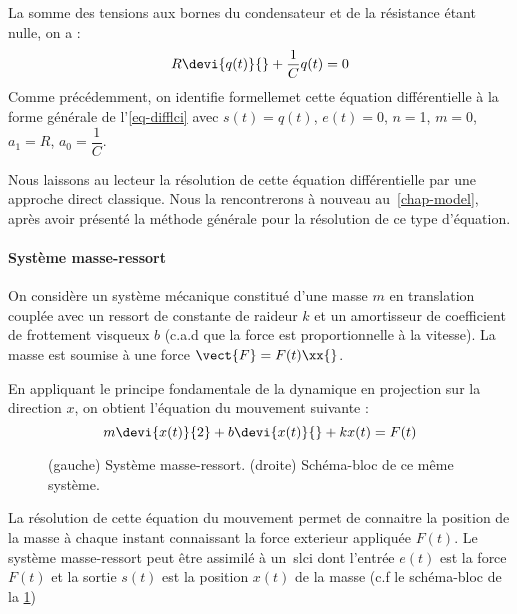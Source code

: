 La somme des tensions aux bornes du condensateur et de la résistance étant nulle, on a :
\begin{align*}
    R\devi{q(t)}{}+\dfrac{1}{C}q(t)=0 
\end{align*}
Comme précédemment, on identifie formellemet cette équation différentielle 
à la forme générale de l'\cref{eq-difflci} avec $s(t)=q(t)$, $e(t)=0$, 
$n=$1, $m=0$, $a_1=R$, $a_0=\dfrac{1}{C}$.

Nous laissons au lecteur la résolution de cette équation différentielle 
par une approche direct classique.
Nous la rencontrerons à nouveau au~\cref{chap-model}, après avoir 
présenté la méthode générale pour la résolution de ce type d'équation.

\paragraph{Système masse-ressort}

On considère un système mécanique constitué d'une masse $m$ en translation 
couplée avec un ressort de constante
de raideur $k$ et un amortisseur de coefficient de frottement 
visqueux $b$ (c.a.d que la force est 
proportionnelle à la vitesse). 
La masse est soumise à une force $\vect{F}=F(t)\xx{}$.

En appliquant le principe fondamentale de la dynamique en projection 
sur la direction $x$, on obtient l'équation du mouvement suivante :                                                                                 
$$                                                                                                                            
m\devi{x(t)}{2}+b\devi{x(t)}{}+kx(t)=F(t)
$$ 

\begin{figure}[!h]
    \centering
    
    \caption{(gauche) Système masse-ressort. (droite) Schéma-bloc de ce même système.\label{fig-masse-ressort}}
\end{figure}

La résolution de cette équation du mouvement permet de connaitre la position de la masse
à chaque instant connaissant la force exterieur appliquée $F(t)$. Le système masse-ressort
peut être assimilé à un~\gls{slci} dont l'entrée $e(t)$ est la force $F(t)$ et 
la sortie $s(t)$ est la position $x(t)$ de la masse (c.f le schéma-bloc de la \cref{fig-masse-ressort})

